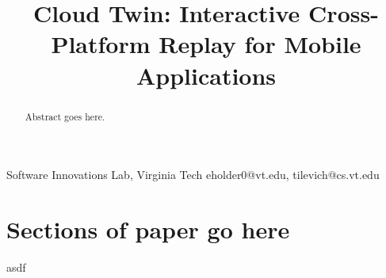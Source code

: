 \normalfont\documentclass[10pt]{sigplanconf}
\begin{document}
\permissiontopublish
{} 

\title{Cloud Twin: Interactive Cross-Platform Replay for Mobile Applications}

					 {Software Innovations Lab, Virginia Tech}
					 {eholder0@vt.edu, tilevich@cs.vt.edu}

\maketitle



\begin{abstract}

Abstract goes here.

\end{abstract}



\section{Sections of paper go here} 
\label{sections}

asdf





\medskip
%

{}
\end{document}
